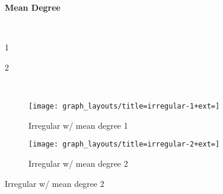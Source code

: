 \begin{figure}
\begin{center}

\begin{minipage}{0.05\textwidth}
~
\end{minipage}%
\begin{minipage}{0.95\textwidth}
\begin{minipage}{0.05\textwidth}
~
\end{minipage}%
\begin{minipage}{0.95\textwidth}
\centering
\large
\textbf{Mean Degree}
\end{minipage}
\begin{minipage}{0.05\textwidth}
~
\end{minipage}%
\begin{minipage}{0.95\linewidth}
\begin{minipage}{0.5\textwidth}
\centering
\large
1
\end{minipage}%
\begin{minipage}{0.5\textwidth}
\centering
\large
2
\end{minipage}
\end{minipage}
\end{minipage}\\
\vspace{2ex}





\begin{minipage}{0.05\textwidth}
\large
{}
\end{minipage}%
\begin{minipage}{0.95\textwidth}
\begin{minipage}{0.05\linewidth}
\large
{}
\end{minipage}%
\begin{minipage}{0.95\linewidth}
\begin{subfigure}[b]{0.5\textwidth}
\centering
\texttt{[image: graph\_layouts/title=irregular-1+ext=]}%
\caption{
Irregular w/ mean degree 1
}
\label{fig:regular_degree_1}
\label{fig:irregular_1}
\end{subfigure}
\begin{subfigure}[b]{0.5\textwidth}
\centering
\texttt{[image: graph\_layouts/title=irregular-2+ext=]}%
\caption{
Irregular w/ mean degree 2
}
\label{fig:irregular_2}
\label{fig:irregular_degree_2}
\end{subfigure}


\end{minipage}
\end{minipage}
\end{center}
\end{figure}
